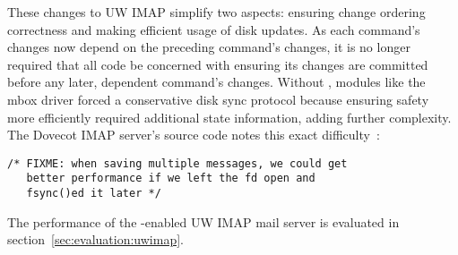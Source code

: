These changes to UW IMAP simplify two aspects:
%
ensuring change ordering correctness
%
and making efficient usage of disk updates.
%
As each command's changes now depend on the preceding command's
changes, it is no longer required that all code be concerned with
ensuring its changes are committed before any later, dependent
command's changes. Without \opgroups, modules like the mbox driver
forced a conservative disk sync protocol because ensuring safety more
efficiently required additional state information, adding further
complexity. The Dovecot IMAP server's source code notes this exact
difficulty~\cite[maildir-save.c]{dovecot}:

\vspace{-0.5\baselineskip}
\begin{scriptsize}
\begin{verbatim}
/* FIXME: when saving multiple messages, we could get
   better performance if we left the fd open and
   fsync()ed it later */
\end{verbatim}
\end{scriptsize}
\vspace{-0.5\baselineskip}

The performance of the \opgroup{}-enabled UW IMAP mail server is
evaluated in section~\ref{sec:evaluation:uwimap}.
